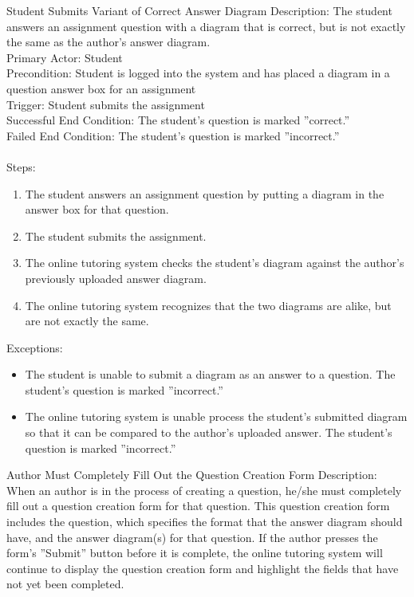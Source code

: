     \begin{section}{Student Submits Variant of Correct Answer Diagram}
        Description: The student answers an assignment question with a diagram that is correct, but is not exactly the same as the author's answer diagram. \\
        Primary Actor: Student \\
        Precondition: Student is logged into the system and has placed a diagram in a question answer box for an assignment \\ 
        Trigger: Student submits the assignment \\
        Successful End Condition: The student's question is marked ''correct.'' \\
        Failed End Condition: The student's question is marked ''incorrect.'' \\
        \\
        Steps:
        \begin{enumerate}
            \item{The student answers an assignment question by putting a diagram in the answer box for that question.}
            \item{The student submits the assignment.}
            \item{The online tutoring system checks the student's diagram against the author's previously uploaded answer diagram.}
            \item{The online tutoring system recognizes that the two diagrams are alike, but are not exactly the same.}
        \end{enumerate}
        Exceptions:
        \begin{itemize}
            \item{The student is unable to submit a diagram as an answer to a question.  The student's question is marked ''incorrect.''} 
            \item{The online tutoring system is unable process the student's submitted diagram so that it can be compared to the author's uploaded answer.  
            The student's question is marked ''incorrect.''}
        \end{itemize}
    \end{section}
    
    \begin{section}{Author Must Completely Fill Out the Question Creation Form}
        Description: When an author is in the process of creating a question, he/she must completely
        fill out a question creation form for that question.  This question creation form includes the question, 
        which specifies the format that the answer diagram should have, and the answer diagram(s) for that question. 
        If the author presses the form's ''Submit'' button before it is complete, the online tutoring
        system will continue to display the question creation form and highlight the fields that have 
        not yet been completed.
    \end{section}


    


